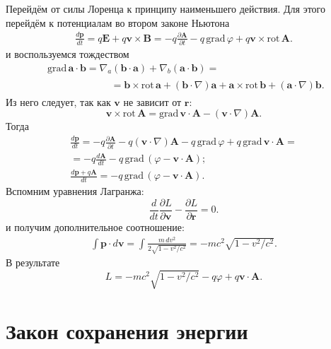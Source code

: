 \documentclass[a4paper,14pt]{extreport} %
\newcommand{\dff}[2]{\frac{\partial #1}{\partial #2}}
\newcommand{\Df}[1]{\frac{d}{d #1}}
\newcommand{\Dff}[2]{\frac{d #1}{d #2}}
\renewcommand{\vec}[1]{\bm{#1}}
\newcommand{\rot}{\mathrm{rot}\,}
\newcommand{\grad}{\mathrm{grad}\,}
\begin{document}
	Перейдём от силы Лоренца к принципу наименьшего действия. Для этого перейдём к потенциалам во втором законе Ньютона
	\begin{gather*}
		\Dff{\vec{p}}{t} = q \vec{E} + q \vec{v} \times \vec{B} = - q \dff{\vec{A}}{t} - q\, \grad \varphi + q \vec{v} \times \rot \vec{A}.
	\end{gather*}
	и воспользуемся тождеством
	\begin{align*}
		&\grad \vec{a} \cdot \vec{b} = \nabla_a(\vec{b}\cdot\vec{a}) + \nabla_b(\vec{a}\cdot\vec{b}) = \\
		&\begin{gathered} 
		\qquad \qquad \qquad = \vec{b}\times\rot \vec{a} + (\vec{b}\cdot\nabla)\vec{a} + \vec{a}\times\rot \vec{b} + (\vec{a}\cdot\nabla)\vec{b}.
		\end{gathered}
	\end{align*}
	Из него следует, так как $\vec{v}$ не зависит от $\vec{r}$:
	\begin{equation*}
		\vec{v}\times\rot\vec{A} = \grad \vec{v}\cdot\vec{A} - (\vec{v}\cdot\nabla)\vec{A}.
	\end{equation*}
	Тогда
	\begin{gather*}
		\Dff{\vec{p}}{t} = - q \dff{\vec{A}}{t} - q (\vec{v}\cdot\nabla)\vec{A} - q\, \grad \varphi + q\,\grad \vec{v}\cdot\vec{A} = \\ =
		- q \Dff{\vec{A}}{t} - q\, \grad \left(\varphi - \vec{v}\cdot\vec{A} \right); \\
		\Dff{\vec{p} + q \vec{A}}{t} = - q\, \grad \left(\varphi - \vec{v}\cdot\vec{A} \right).
	\end{gather*}
	Вспомним уравнения Лагранжа:
	\begin{equation*}
		\Df{t} \dff{L}{\vec{v}} - \dff{L}{\vec{r}} = 0.
	\end{equation*}
	и получим дополнительное соотношение:
	\begin{gather*}
		\int\vec{p}\cdot d\vec{v} = \int \frac{m\, dv^2}{2\sqrt{1 - v^2/c^2}} = - mc^2 \sqrt{1 - v^2/c^2}.
	\end{gather*}
	В результате
	\begin{equation*}
		L = - mc^2 \sqrt{1 - v^2/c^2} - q \varphi + q \vec{v}\cdot\vec{A}.
	\end{equation*}
	
	\section{Закон сохранения энергии}
	
\end{document}
